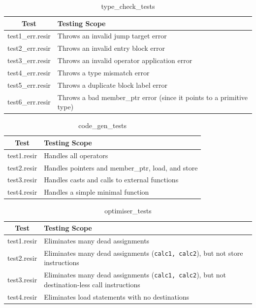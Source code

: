 \documentclass[11pt, a4paper]{article}
\begin{document}
\begin{table}[H]
    \centering
    \begin{tabular}{| c | l |}
        \hline
        \textbf{Test} & \textbf{Testing Scope} \\
        \hline
        test1\_err.resir                  & Throws an invalid jump target error  \\
        test2\_err.resir                 & Throws an invalid entry block error       \\
        test3\_err.resir              & Throws an invalid operator application error       \\
        test4\_err.resir              & Throws a type mismatch error       \\
        test5\_err.resir              & Throws a duplicate block label error       \\
        test6\_err.resir              & Throws a bad member\_ptr error (since it points to a primitive type)       \\
        \hline
    \end{tabular}
    \caption{type\_check\_tests}
\end{table}

\bigskip

\begin{table}[H]
    \centering
    \begin{tabular}{| c | l |}
        \hline
        \textbf{Test} & \textbf{Testing Scope} \\
        \hline
        test1.resir                  & Handles all operators  \\
        test2.resir                 & Handles pointers and member\_ptr, load, and store       \\
        test3.resir              & Handles casts and calls to external functions       \\
        test4.resir              & Handles a simple minimal function       \\
        \hline
    \end{tabular}
    \caption{code\_gen\_tests}
\end{table}

\bigskip

\begin{table}[H]
    \centering
    \begin{tabular}{| c | l |}
        \hline
        \textbf{Test} & \textbf{Testing Scope} \\
        \hline
        test1.resir                  & Eliminates many dead assignments  \\
        test2.resir                 & Eliminates many dead assignments (\texttt{calc1, calc2}), but not store instructions       \\
        test3.resir              & Eliminates many dead assignments (\texttt{calc1, calc2}), but not destination-less call instructions       \\
        test4.resir              & Eliminates load statements with no destinations       \\
        \hline
    \end{tabular}
    \caption{optimiser\_tests}
\end{table}
\end{document}
